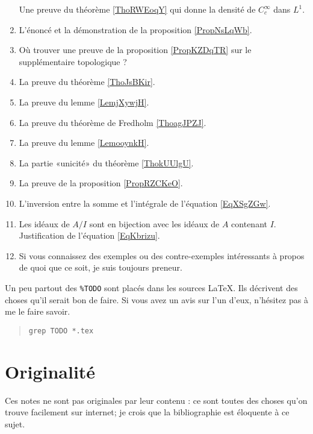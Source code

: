 \begin{enumerate}
        Une preuve du théorème \ref{ThoRWEoqY} qui donne la densité de \( C^{\infty}_c\) dans \( L^1\).
    \item
        L'énoncé et la démonstration de la proposition \ref{PropNsLqWb}.
    \item
        Où trouver une preuve de la proposition \ref{PropKZDqTR} sur le supplémentaire topologique ?
    \item
        La preuve du théorème \ref{ThoJsBKir}.
    \item
        La preuve du lemme \ref{LemjXywjH}.
    \item
        La preuve du théorème de Fredholm \ref{ThoagJPZJ}.
    \item
        La preuve du lemme \ref{LemooynkH}.
    \item
        La partie «unicité» du théorème \ref{ThokUUlgU}.
    \item
        La preuve de la proposition \ref{PropRZCKeO}.
    \item
        L'inversion entre la somme et l'intégrale de l'équation \eqref{EqXSgZGw}.
    \item
        Les idéaux de \( A/I\) sont en bijection avec les idéaux de \( A\) contenant \( I\). Justification de l'équation \eqref{EqKbrizu}.
    \item
        Si vous connaissez des exemples ou des contre-exemples intéressants à propos de quoi que ce soit, je suis toujours preneur.
\end{enumerate}

Un peu partout des \verb+%TODO+ sont placés dans les sources \LaTeX. Ils décrivent des choses qu'il serait bon de faire. Si vous avez un avis sur l'un d'eux, n'hésitez pas à me le faire savoir.
\begin{quote}
    \texttt{grep TODO *.tex}
\end{quote}

\section*{Originalité}

Ces notes ne sont pas originales par leur contenu : ce sont toutes des choses qu'on trouve facilement sur internet; je crois que la bibliographie est éloquente à ce sujet.

